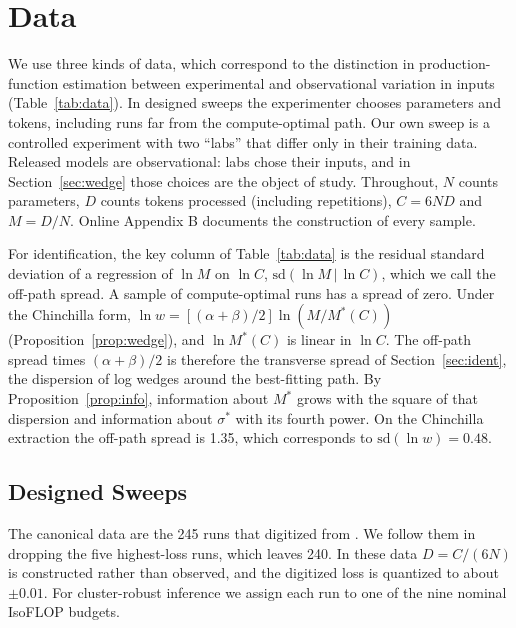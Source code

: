 \section{Data}\label{sec:data}

We use three kinds of data, which correspond to the distinction in production-function estimation between
experimental and observational variation in inputs (Table~\ref{tab:data}). In designed sweeps the experimenter
chooses parameters and tokens, including runs far from the compute-optimal path. Our own sweep is a controlled
experiment with two ``labs'' that differ only in their training data. Released models are observational: labs chose
their inputs, and in Section~\ref{sec:wedge} those choices are the object of study. Throughout, $N$ counts
parameters, $D$ counts tokens processed (including repetitions), $C=6ND$ and $M=D/N$. Online Appendix B documents
the construction of every sample.

For identification, the key column of Table~\ref{tab:data} is the residual standard deviation of a regression of
$\ln M$ on $\ln C$, $\mathrm{sd}(\ln M\,|\,\ln C)$, which we call the off-path spread. A sample of compute-optimal runs
has a spread of zero. Under the Chinchilla form, $\ln w=[(\alpha+\beta)/2]\ln(M/M^{*}(C))$
(Proposition~\ref{prop:wedge}), and $\ln M^{*}(C)$ is linear in $\ln C$. The off-path spread times $(\alpha+\beta)/2$ is
therefore the transverse spread of Section~\ref{sec:ident}, the dispersion of log wedges around the best-fitting path.
By Proposition~\ref{prop:info}, information about $M^{*}$ grows with the square of that dispersion and information
about $\sigma^{*}$ with its fourth power. On the Chinchilla extraction the off-path spread is 1.35, which corresponds
to $\mathrm{sd}(\ln w)=0.48$.



\subsection{Designed Sweeps}

The canonical data are the 245 runs that \citet{besiroglu2024chinchilla} digitized from \citet{hoffmann2022training}.
We follow them in dropping the five highest-loss runs, which leaves 240. In these data $D=C/(6N)$ is constructed rather
than observed, and the digitized loss is quantized to about $\pm0.01$. For cluster-robust inference we assign each run
to one of the nine nominal IsoFLOP budgets.

